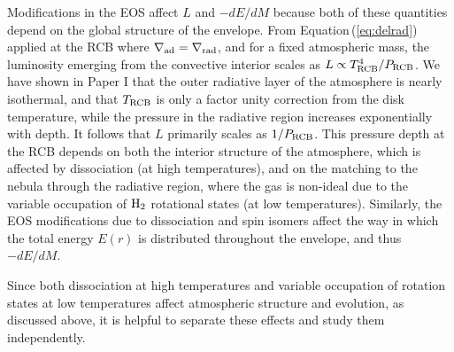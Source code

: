 \documentclass[apj]{emulateapj}
\newcommand{\delad}{\nabla_{\rm ad}}
\newcommand{\delrad}{\nabla_{\rm rad}}
\newcommand{\Eq}[1]{Equation\,(\ref{#1})}
\newcommand{\cb}{_{\rm RCB}}
\begin{document}
Modifications in the EOS affect $L$ and $-dE/dM$ because both of these quantities depend on the global structure of the envelope. From \Eq{eq:delrad} applied at the RCB where $\delad=\delrad$, and for a fixed atmospheric mass, the luminosity emerging from the convective interior scales as $L \propto T\cb^4/P\cb$. We have shown in Paper I that the outer radiative layer of the atmosphere is nearly isothermal, and that $T\cb$ is only a factor unity correction from the disk temperature, while the pressure in the radiative region increases exponentially with depth. It follows that $L$ primarily scales as $1/P\cb$. This pressure depth at the RCB depends on both the interior structure of the atmosphere, which is affected by dissociation (at high temperatures), and on the matching to the nebula through the radiative region, where the gas is non-ideal due to the variable occupation of $\rm{H}_2$ rotational states (at low temperatures). Similarly, the EOS modifications due to dissociation and spin isomers affect the way in which the total energy $E(r)$ is distributed throughout the envelope, and thus $-dE/dM$.

Since both dissociation at high temperatures and variable occupation of rotation states at low temperatures affect atmospheric structure and evolution, as discussed above, it is helpful to separate these effects and study them independently. 

%
%
%
%
%
%
\end{document}
